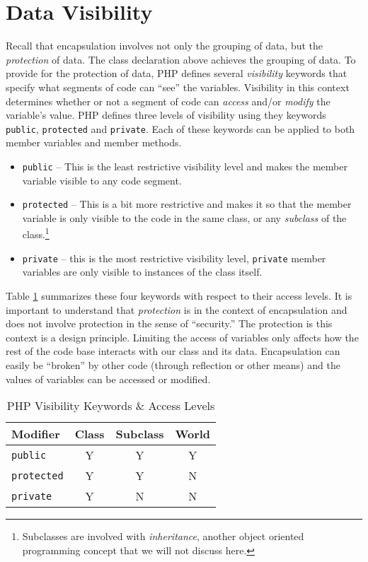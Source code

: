 \section{Data Visibility}

Recall that encapsulation involves not only the grouping of data, but
the \emph{protection} of data.  The class declaration above achieves
the grouping of data.  To provide for the protection of data, PHP
defines several \emph{visibility} keywords that specify what segments
of code can ``see'' the variables.  Visibility in this context determines
whether or not a segment of code can \emph{access} and/or \emph{modify}
the variable's value.  PHP defines three levels of visibility using
they keywords \texttt{public}, \texttt{protected}
and \texttt{private}.  Each of these keywords can
be applied to both member variables and member methods.

\begin{itemize}
  \item \texttt{public} -- This is the least restrictive 
    visibility level and makes the member variable visible to any
    code segment.
  \item \texttt{protected} -- This is a bit more restrictive
    and makes it so that the member variable is only visible to the
    code in the same class, or any \emph{subclass} of the 
    class.\footnote{Subclasses are involved with \emph{inheritance}, 
    another object oriented programming concept that we will not
    discuss here.}
  \item \texttt{private} -- this is the most restrictive 
    visibility level, \texttt{private} member variables are
    only visible to instances of the class itself.  
\end{itemize}

Table \ref{table:phpVisibilityKeywords} summarizes these four keywords
with respect to their access levels.  It is important to understand that
\emph{protection} is in the context of encapsulation and does not involve
protection in the sense of ``security.''  The protection is this context
is a design principle.  Limiting the access of variables only affects 
how the rest of the code base interacts with our class and its data.  
Encapsulation can easily be ``broken'' by other code (through reflection
or other means) and the values of variables can be accessed or modified.

\begin{table}[h]
\centering
\begin{tabular}{|l|c|c|c|}
\hline
Modifier & Class  & Subclass & World \\
\hline\hline
\texttt{public} & Y  & Y & Y \\
\hline
\texttt{protected} & Y  & Y & N \\
\hline
\texttt{private} & Y & N & N \\
\hline
\end{tabular}
\caption{PHP Visibility Keywords \& Access Levels}
\label{table:phpVisibilityKeywords}
\end{table}

